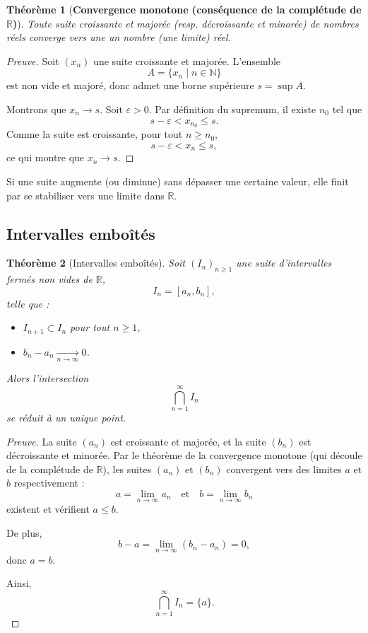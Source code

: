\documentclass{report} %
\theoremstyle{definition}  %
\theoremstyle{plain} %
\newtheorem{theorem}{Théorème}[chapter]
\theoremstyle{remark} %
\begin{document}
\medskip


\begin{theorem}[\textbf{Convergence monotone (conséquence de la complétude de \(\mathbb{R}\))}]
Toute suite croissante et majorée (resp. décroissante et minorée) de nombres réels 
converge vers une un nombre (une limite) réel.
\end{theorem}

\medskip

\begin{proof}[Preuve]
Soit \((x_n)\) une suite croissante et majorée.
L’ensemble
\[
A = \{x_n \mid n \in \mathbb{N}\}
\]
est non vide et majoré, donc admet une borne supérieure \(s = \sup A\).

Montrons que \(x_n \to s\).
Soit \(\varepsilon > 0\).
Par définition du supremum, il existe \(n_0\) tel que
\[
s - \varepsilon < x_{n_0} \le s.
\]
Comme la suite est croissante, pour tout \(n \ge n_0\),
\[
s - \varepsilon < x_n \le s,
\]
ce qui montre que \(x_n \to s\).
\end{proof}

\medskip
\noindent

\medskip
Si une suite augmente (ou diminue) sans dépasser une certaine valeur, 
elle finit par se stabiliser vers une limite dans \(\mathbb{R}\).

\bigskip

\subsection{\textbf{Intervalles emboîtés}}

\begin{theorem}[Intervalles emboîtés]
Soit \((I_n)_{n \ge 1}\) une suite d’intervalles fermés non vides de \(\mathbb{R}\),
\[
I_n = [a_n,b_n],
\]
telle que :
\begin{itemize}
\item \(I_{n+1} \subset I_n\) pour tout \(n \ge 1\),
\item \(b_n - a_n \xrightarrow[n\to\infty]{} 0\).
\end{itemize}
Alors l’intersection
\[
\bigcap_{n=1}^{\infty} I_n
\]
se réduit à un unique point.
\end{theorem}

\medskip

\begin{proof}[Preuve]
La suite \((a_n)\) est croissante et majorée, et la suite \((b_n)\) est
décroissante et minorée.
Par le théorème de la convergence monotone (qui découle de la complétude de \(\mathbb{R}\)), 
les suites \((a_n)\) et \((b_n)\) convergent vers des limites \(a\) et \(b\) respectivement :
\[
a = \lim_{n\to\infty} a_n
\quad \text{et} \quad
b = \lim_{n\to\infty} b_n
\]
existent et vérifient \(a \le b\).

De plus,
\[
b - a = \lim_{n\to\infty} (b_n - a_n) = 0,
\]
donc \(a = b\).

Ainsi,
\[
\bigcap_{n=1}^{\infty} I_n = \{a\}.
\]
\end{proof}
\end{document}
